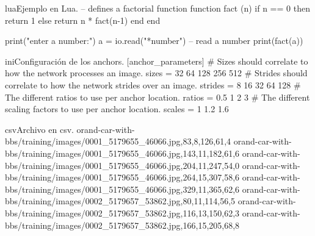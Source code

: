 \begin{sourcecode}{lua}{Ejemplo en Lua.}
-- defines a factorial function
function fact (n)
	if n == 0 then
		return 1
	else
		return n * fact(n-1)
	end
end

print("enter a number:")
a = io.read("*number")        -- read a number
print(fact(a))
\end{sourcecode}

\begin{sourcecode}{ini}{Configuración de los anchors.}
[anchor_parameters]
# Sizes should correlate to how the network processes an image.
sizes   = 32 64 128 256 512
# Strides should correlate to how the network strides over an image.
strides = 8 16 32 64 128
# The different ratios to use per anchor location.
ratios  = 0.5 1 2 3
# The different scaling factors to use per anchor location.
scales  = 1 1.2 1.6
\end{sourcecode}

\begin{sourcecode}{csv}{Archivo en csv.}
orand-car-with-bbs/training/images/0001_5179655_46066.jpg,83,8,126,61,4
orand-car-with-bbs/training/images/0001_5179655_46066.jpg,143,11,182,61,6
orand-car-with-bbs/training/images/0001_5179655_46066.jpg,204,11,247,54,0
orand-car-with-bbs/training/images/0001_5179655_46066.jpg,264,15,307,58,6
orand-car-with-bbs/training/images/0001_5179655_46066.jpg,329,11,365,62,6
orand-car-with-bbs/training/images/0002_5179657_53862.jpg,80,11,114,56,5
orand-car-with-bbs/training/images/0002_5179657_53862.jpg,116,13,150,62,3
orand-car-with-bbs/training/images/0002_5179657_53862.jpg,166,15,205,68,8
\end{sourcecode}

